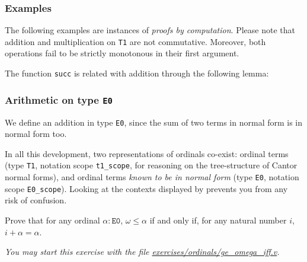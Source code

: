 \subsubsection{Examples}

The following examples are instances of \emph{proofs by computation}. Please note that  addition and multiplication on \texttt{T1}
are not commutative. Moreover,  both operations fail to be strictly monotonous in their first argument.






The function \texttt{succ} is related with addition through the following lemma:




\subsubsection{Arithmetic on type \texttt{E0}}

 We define an addition in type \texttt{E0}, since the sum of two terms in normal form is in normal form too.







\begin{remark}
In all this development, two representations of ordinals co-exist: ordinal terms (type \texttt{T1}, notation scope \texttt{t1\_scope}, for reasoning on the tree-structure of Cantor normal forms), and ordinal terms \emph{known to be in normal form} (type \texttt{E0}, notation scope \texttt{E0\_scope}). Looking at the contexts displayed by \coq{} prevents you from any risk of confusion.
\end{remark}

\begin{exercise}
Prove that for any ordinal $\alpha:\texttt{E0}$, 
$\omega\leq \alpha$ if and only if, for any natural number $i$,
$i+\alpha=\alpha$.

\emph{You may start this exercise with the file
    \href{https://github.com/coq-community/hydra-battles/tree/master/exercises/ordinals/ge_omega_iff.v}{exercises/ordinals/ge\_omega\_iff.v}.}
\end{exercise}

